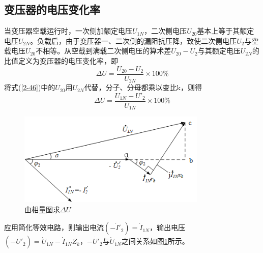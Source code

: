 \documentclass{book}
\begin{document}
\subsection{变压器的电压变化率}
当变压器空载运行时，一次侧加额定电压${{U}_{1N}}$，二次侧电压${{U}_{20}}$基本上等于其额定电压${{U}_{2N}}$。负载后，由于变压器一、二次侧的漏阻抗压降，致使二次侧电压${{U}_{2}}$与空载电压${{U}_{20}}$不相等。从空载到满载二次侧电压的算术差${{U}_{20}}-{{U}_{2}}$与其额定电压${{U}_{2N}}$的比值定义为变压器的电压变化率，即
\begin{equation}
\Delta U=\frac{{{U}_{20}}-{{U}_{2}}}{{{U}_{2N}}}\times 100\%
\label{2-46}
\end{equation}
将式(\ref{2-46})中的${{U}_{20}}$用${{U}_{2N}}$代替，分子、分母都乘以变比k，则得
\begin{equation}
\Delta U=\frac{{{U}_{1N}}-{{{{U}'}}_{2}}}{{{U}_{1N}}}\times 100\%
\label{2-47}
\end{equation}
\begin{figure}[H]
	\centering
	\includegraphics[width=0.80\textwidth]{3-19g.png}
	\caption{由相量图求$\Delta U$}
	\label{fig_3.19}
\end{figure}
应用简化等效电路，则输出电流$(-{{{\dot{I}}'}_{2}})={{\dot{I}}_{1N}}$，输出电压 $(-{{\dot{{U}'}}_{2}})={{\dot{U}}_{1N}}-{{\dot{I}}_{1N}}{{Z}_{k}}$，$-{{\dot{{U}'}}_{2}}$与${{\dot{{U}}}_{1N}}$之间关系如图\ref{fig_3.19}所示。
\end{document}
